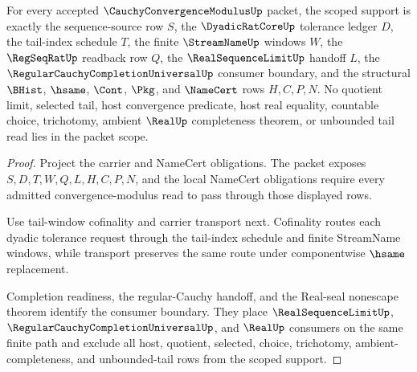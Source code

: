 \begin{theorem}
\label{thm:cauchy-convergence-modulus-scoped-support}
For every accepted $\CauchyConvergenceModulusUp$ packet, the scoped support is exactly the sequence-source row $S$, the $\DyadicRatCoreUp$ tolerance ledger $D$, the tail-index schedule $T$, the finite $\StreamNameUp$ windows $W$, the $\RegSeqRatUp$ readback row $Q$, the $\RealSequenceLimitUp$ handoff $L$, the $\RegularCauchyCompletionUniversalUp$ consumer boundary, and the structural $\BHist$, $\hsame$, $\Cont$, $\Pkg$, and $\NameCert$ rows $H,C,P,N$. No quotient limit, selected tail, host convergence predicate, host real equality, countable choice, trichotomy, ambient $\RealUp$ completeness theorem, or unbounded tail read lies in the packet scope.
\end{theorem}
\begin{proof}
Project the carrier and NameCert obligations. The packet exposes $S,D,T,W,Q,L,H,C,P,N$, and the local NameCert obligations require every admitted convergence-modulus read to pass through those displayed rows.

Use tail-window cofinality and carrier transport next. Cofinality routes each dyadic tolerance request through the tail-index schedule and finite StreamName windows, while transport preserves the same route under componentwise $\hsame$ replacement.

Completion readiness, the regular-Cauchy handoff, and the Real-seal nonescape theorem identify the consumer boundary. They place $\RealSequenceLimitUp$, $\RegularCauchyCompletionUniversalUp$, and $\RealUp$ consumers on the same finite path and exclude all host, quotient, selected, choice, trichotomy, ambient-completeness, and unbounded-tail rows from the scoped support.
\end{proof}

